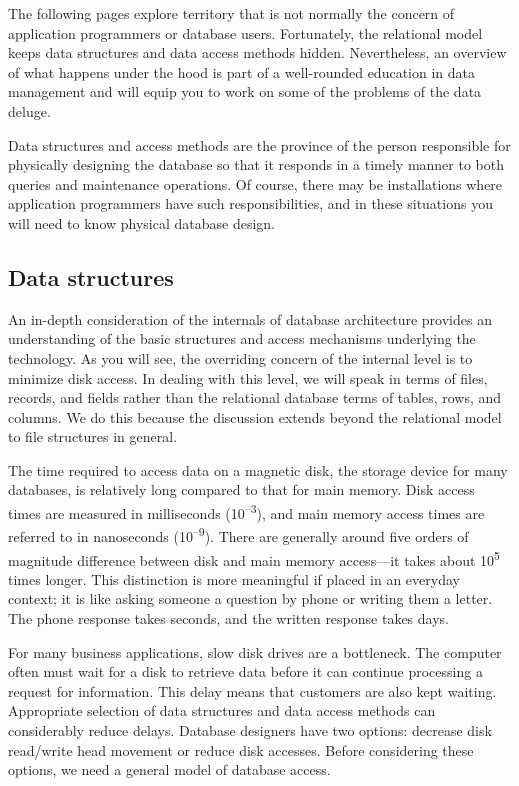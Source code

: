 \documentclass[
]{article}
\begin{document}
The following pages explore territory that is not normally the concern
of application programmers or database users. Fortunately, the
relational model keeps data structures and data access methods hidden.
Nevertheless, an overview of what happens under the hood is part of a
well-rounded education in data management and will equip you to work on
some of the problems of the data deluge.

Data structures and access methods are the province of the person
responsible for physically designing the database so that it responds in
a timely manner to both queries and maintenance operations. Of course,
there may be installations where application programmers have such
responsibilities, and in these situations you will need to know physical
database design.

\hypertarget{data-structures-1}{%
\subsection*{Data structures}\label{data-structures-1}}

An in-depth consideration of the internals of database architecture
provides an understanding of the basic structures and access mechanisms
underlying the technology. As you will see, the overriding concern of
the internal level is to minimize disk access. In dealing with this
level, we will speak in terms of files, records, and fields rather than
the relational database terms of tables, rows, and columns. We do this
because the discussion extends beyond the relational model to file
structures in general.

The time required to access data on a magnetic disk, the storage device
for many databases, is relatively long compared to that for main memory.
Disk access times are measured in milliseconds (10\textsuperscript{--3}), and main
memory access times are referred to in nanoseconds (10\textsuperscript{--9}). There are
generally around five orders of magnitude difference between disk and
main memory access---it takes about 10\textsuperscript{5} times longer. This distinction
is more meaningful if placed in an everyday context; it is like asking
someone a question by phone or writing them a letter. The phone response
takes seconds, and the written response takes days.

For many business applications, slow disk drives are a bottleneck. The
computer often must wait for a disk to retrieve data before it can
continue processing a request for information. This delay means that
customers are also kept waiting. Appropriate selection of data
structures and data access methods can considerably reduce delays.
Database designers have two options: decrease disk read/write head
movement or reduce disk accesses. Before considering these options, we
need a general model of database access.
\end{document}

